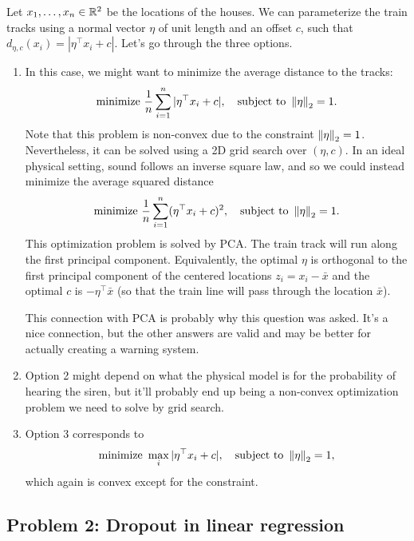 Let $x_1, \dots, x_n \in \mathbb{R}^2$ be the locations of the houses. We can parameterize the train tracks using a normal vector $\eta$ of unit length and an offset $c$, such that $d_{\eta, c}(x_i) = |\eta^\top x_i + c|$. Let's go through the three options. 
\begin{enumerate}
	\item In this case, we might want to minimize the average distance to the tracks:
	\begin{equation*}
	\text{minimize}\  \frac{1}{n}\sum_{i = 1}^n |\eta^\top x_i + c|, \quad \text{subject to } \left \lVert \eta \right \rVert_2 = 1.
	\end{equation*}
	Note that this problem is non-convex due to the constraint $\left \lVert \eta \right \rVert_2 = 1$. Nevertheless, it can be solved using a 2D grid search over $(\eta, c)$. In an ideal physical setting, sound follows an inverse square law, and so we could instead minimize the average squared distance
	\begin{equation*}
	\text{minimize}\  \frac{1}{n}\sum_{i = 1}^n (\eta^\top x_i + c)^2, \quad \text{subject to } \left \lVert \eta \right \rVert_2 = 1.
	\end{equation*}
	This optimization problem is solved by PCA. The train track will run along the first principal component. Equivalently, the optimal $\eta$ is orthogonal to the first principal component of the centered locations $z_i = x_i - \bar{x}$ and the optimal $c$ is $-\eta^\top \bar{x}$ (so that the train line will pass through the location $\bar{x}$). 

	This connection with PCA is probably why this question was asked. It's a nice connection, but the other answers are valid and may be better for actually creating a warning system. 
	\item Option 2 might depend on what the physical model is for the probability of hearing the siren, but it'll probably end up being a non-convex optimization problem we need to solve by grid search.
	\item Option 3 corresponds to
	\begin{equation*}
	\text{minimize}\  \max_i |\eta^\top x_i + c|, \quad \text{subject to } \left \lVert \eta \right \rVert_2 = 1,
	\end{equation*}
	which again is convex except for the constraint.
\end{enumerate}




	


\subsection*{Problem 2: Dropout in linear regression}

